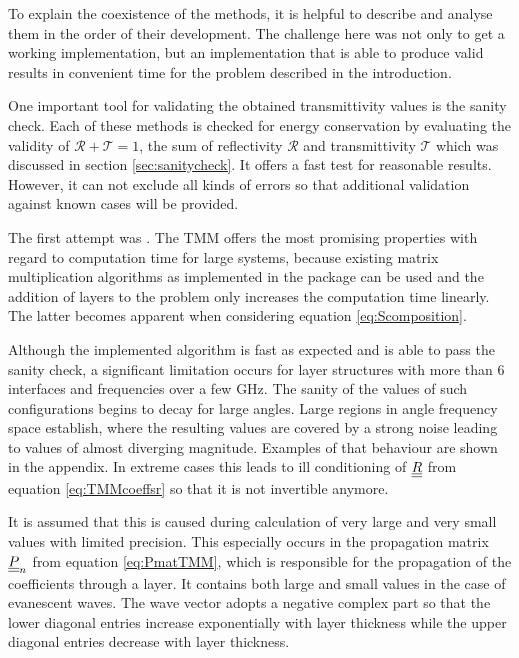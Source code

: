To explain the coexistence of the methods, it is helpful to describe and
analyse them in the order of their development. The challenge here was not only
to get a working implementation, but an implementation that is able to produce
valid results in convenient time for the problem described in the introduction.

One important tool for validating the obtained transmittivity values is the
sanity check. Each of these methods is checked for energy conservation by
evaluating the
validity of $\mathcal{R}+\mathcal{T}=1$, the sum of reflectivity $\mathcal{R}$
and transmittivity $\mathcal{T}$ which was discussed in section
\ref{sec:sanitycheck}. It offers a fast test for reasonable
results. However, it can not exclude all kinds of errors so that additional
validation against known cases will be provided.

The first attempt was . The TMM offers the most promising
properties with regard to computation time for large systems, because existing
matrix multiplication algorithms as implemented in the  package can
be used and the addition of layers to the problem only increases the
computation time linearly. The latter becomes apparent when considering
equation \ref{eq:Scomposition}.

Although the implemented algorithm is fast as expected and is able to pass the
sanity check, a significant limitation occurs for layer structures with more
than 6 interfaces and frequencies over a few GHz. The sanity of the values of
such configurations begins to decay for large angles. Large regions in angle
frequency space establish, where the resulting values are covered by a strong
noise leading to values of almost diverging magnitude.	Examples of that
behaviour are shown in the appendix. In extreme cases this
leads to ill conditioning of $\underline{\underline{R}}$ from equation \ref{eq:TMMcoeffsr} so
that it is not invertible anymore.

It is assumed that this is caused during calculation of very large and very
small values with limited precision. 
This especially occurs in the propagation matrix $\underline{\underline{P}}_n$ from equation
\ref{eq:PmatTMM}, which is
responsible for the propagation of the coefficients through a layer. It
contains both large and small
values in the case of evanescent waves. The wave vector adopts
a negative complex part so that the lower diagonal entries increase
exponentially with layer thickness while the upper diagonal entries decrease
with layer thickness.

